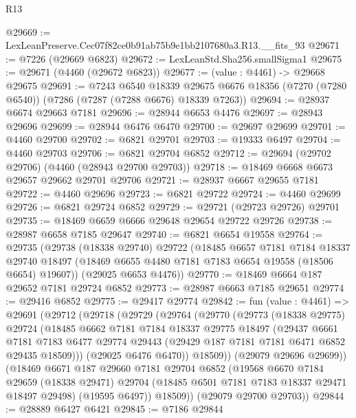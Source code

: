 \begin{lexlean}{R13}
\begin{coremodule}
@29669 := LexLeanPreserve.Cec07f82ce0b91ab75b9e1bb2107680a3.R13.__fits_93
@29671 := @7226 (@29669 @6823)
@29672 := LexLeanStd.Sha256.smallSigma1
@29675 := @29671 (@4460 (@29672 @6823))
@29677 := (value : @4461) -> @29668 @29675
@29691 := @7243
    @6540
    @18339
    @29675
    @6676
    @18356
    (@7270 (@7280 @6540))
    (@7286 (@7287 (@7288 @6676) @18339 @7263))
@29694 := @28937 @6674 @29663 @7181
@29696 := @28944 @6653 @4476
@29697 := @28943 @29696
@29699 := @28944 @6476 @6470
@29700 := @29697 @29699
@29701 := @4460 @29700
@29702 := @6821 @29701
@29703 := @19333 @6497
@29704 := @4460 @29703
@29706 := @6821 @29704 @6852
@29712 := @29694 (@29702 @29706) (@4460 (@28943 @29700 @29703))
@29718 := @18469 @6668 @6673 @29657 @29662 @29701 @29706
@29721 := @28937 @6667 @29655 @7181
@29722 := @4460 @29696
@29723 := @6821 @29722
@29724 := @4460 @29699
@29726 := @6821 @29724 @6852
@29729 := @29721 (@29723 @29726) @29701
@29735 := @18469 @6659 @6666 @29648 @29654 @29722 @29726
@29738 := @28987 @6658 @7185 @29647
@29740 := @6821 @6654 @19558
@29764 := @29735
    (@29738
      (@18338 @29740)
      @29722
      (@18485
        @6657
        @7181
        @7184
        @18337
        @29740
        @18497
        (@18469 @6655 @4480 @7181 @7183 @6654 @19558 (@18506 @6654) @19607))
      (@29025 @6653 @4476))
@29770 := @18469 @6664 @187 @29652 @7181 @29724 @6852
@29773 := @28987 @6663 @7185 @29651
@29774 := @29416 @6852
@29775 := @29417 @29774
@29842 := fun (value : @4461) =>
  @29691
    (@29712
      (@29718
        (@29729
          (@29764
            (@29770
              (@29773
                (@18338 @29775)
                @29724
                (@18485
                  @6662
                  @7181
                  @7184
                  @18337
                  @29775
                  @18497
                  (@29437
                    @6661
                    @7181
                    @7183
                    @6477
                    @29774
                    @29443
                    (@29429 @187 @7181 @7181 @6471 @6852 @29435 @18509)))
                (@29025 @6476 @6470))
              @18509))
          (@29079 @29696 @29699))
        (@18469
          @6671
          @187
          @29660
          @7181
          @29704
          @6852
          (@19568
            @6670
            @7184
            @29659
            (@18338 @29471)
            @29704
            (@18485 @6501 @7181 @7183 @18337 @29471 @18497 @29498)
            (@19595 @6497))
          @18509))
      (@29079 @29700 @29703))
@29844 := @28889 @6427 @6421
@29845 := @7186 @29844

\end{coremodule}
\end{lexlean}
